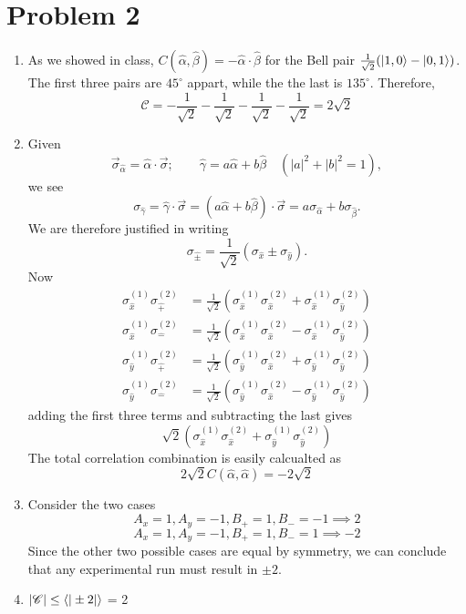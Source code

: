 \documentclass[12pt]{article}
\newcommand{\magsq}[1]{\big|#1\big|^2}
\begin{document}
\section*{Problem 2}
\begin{enumerate}[label=(\alph*)]
    \item As we showed in class, $C(\hat{\alpha},\hat{\beta}) = -\hat{\alpha}\cdot\hat{\beta}$ for the Bell pair $\frac{1}{\sqrt{2}}(\ket{1, 0} - \ket{0, 1})$. The first three pairs are $45^{\circ}$ appart, while the the last is $135^{\circ}$. Therefore,
    \[ \mathscr{C} = -\frac{1}{\sqrt{2}} - \frac{1}{\sqrt{2}} - \frac{1}{\sqrt{2}} - \frac{1}{\sqrt{2}} = 2\sqrt{2} \]

    \item Given
    \[ \vec{\sigma}_{\hat{\alpha}} = \hat{\alpha}\cdot\vec{\sigma}; \qquad \hat{\gamma} = a\hat{\alpha} + b\hat{\beta} \quad (\magsq{a} + \magsq{b} = 1), \]
    we see
    \[ \sigma_{\hat{\gamma}} = \hat{\gamma}\cdot\vec{\sigma} = \left(a\hat{\alpha} + b\hat{\beta}\right)\cdot\vec{\sigma} = a\sigma_{\hat{\alpha}} + b\sigma_{\hat{\beta}}. \]
    We are therefore justified in writing
    \[ \sigma_{\hat{\pm}} = \frac{1}{\sqrt{2}}\left(\sigma_{\hat{x}} \pm \sigma_{\hat{y}}\right). \]
    Now
    \begin{align*}
        \sigma_{\hat{x}}^{(1)}\sigma_{\hat{+}}^{(2)} &= \frac{1}{\sqrt{2}}\left(\sigma_{\hat{x}}^{(1)}\sigma_{\hat{x}}^{(2)} + \sigma_{\hat{x}}^{(1)}\sigma_{\hat{y}}^{(2)} \right) \\
        \sigma_{\hat{x}}^{(1)}\sigma_{\hat{-}}^{(2)} &= \frac{1}{\sqrt{2}}\left(\sigma_{\hat{x}}^{(1)}\sigma_{\hat{x}}^{(2)} - \sigma_{\hat{x}}^{(1)}\sigma_{\hat{y}}^{(2)} \right) \\
        \sigma_{\hat{y}}^{(1)}\sigma_{\hat{+}}^{(2)} &= \frac{1}{\sqrt{2}}\left(\sigma_{\hat{y}}^{(1)}\sigma_{\hat{x}}^{(2)} + \sigma_{\hat{y}}^{(1)}\sigma_{\hat{y}}^{(2)} \right) \\
        \sigma_{\hat{y}}^{(1)}\sigma_{\hat{-}}^{(2)} &= \frac{1}{\sqrt{2}}\left(\sigma_{\hat{y}}^{(1)}\sigma_{\hat{x}}^{(2)} - \sigma_{\hat{y}}^{(1)}\sigma_{\hat{y}}^{(2)} \right)
    \end{align*}
    adding the first three terms and subtracting the last gives
    \[ \sqrt{2}\left(\sigma_{\hat{x}}^{(1)}\sigma_{\hat{x}}^{(2)} + \sigma_{\hat{y}}^{(1)}\sigma_{\hat{y}}^{(2)} \right) \]
    The total correlation combination is easily calcualted as
    \[ 2\sqrt{2}C(\hat{\alpha}, \hat{\alpha}) = -2\sqrt{2} \]

    \item Consider the two cases
    \[ A_x = 1, A_y = -1, B_+ = 1, B_- = -1 \implies 2 \]
    \[ A_x = 1, A_y = -1, B_+ = 1, B_- = 1 \implies -2 \]
    Since the other two possible cases are equal by symmetry, we can conclude that any experimental run must result in $\pm 2$. 

    \item $|\mathscr{C}| \leq \ev{|\pm 2|}$ = 2
\end{enumerate}
\end{document}

